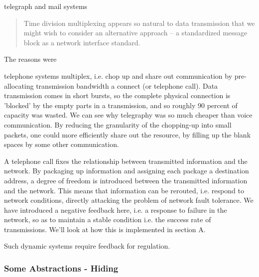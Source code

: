 telegraph and mail systems

\begin{quote}
Time division multiplexing appears so natural to data transmission that we might wish to consider an
alternative approach -- a standardized message block as a network interface standard.\cite{baran1964intro}
\end{quote}

The reasons were


telephone systems multiplex, i.e. chop up and share out communication by pre-allocating transmission
bandwidth a connect (or telephone call). Data transmission comes in short bursts, so the complete
physical connection is 'blocked' by the empty parts in a transmission, and so roughly 90 percent of
capacity was wasted. We can see why telegraphy was so much cheaper than voice communication. By
reducing the granularity of the chopping-up into small packets, one could more efficiently share out
the resource, by filling up the blank spaces by some other communication.



A telephone call fixes the relationship between transmitted information and the network. By
packaging up information and assigning each package a destination address, a degree of freedom is
introduced between the transmitted information and the network. This means that information can be
rerouted, i.e. respond to network conditions, directly attacking the problem of network fault
tolerance. We have introduced a negative feedback here, i.e. a response to failure in the network,
so as to maintain a stable condition i.e. the success rate of transmissions. We'll look at how this
is implemented in section A.

Such dynamic systems require feedback for regulation.

\subsubsection{Some Abstractions - Hiding}


